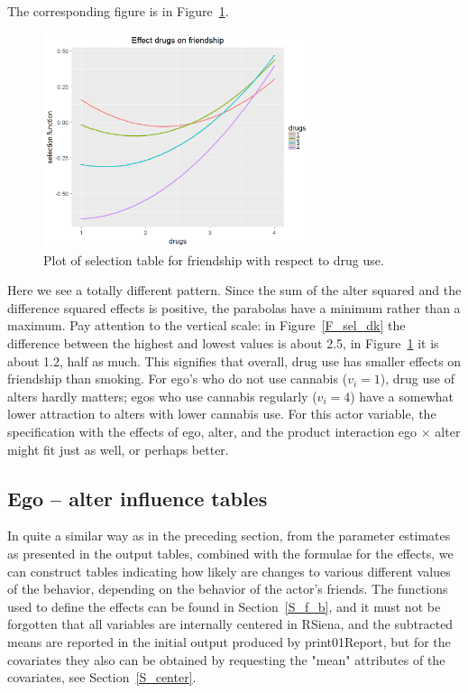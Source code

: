 \documentclass[a4paper,fleqn,11pt]{article}
\newcommand{\+}{\, + \,}
\newcommand{\sfn}[1]{\textsf{#1}}
\newcommand{\rs}{{\sf RSiena}}
\begin{document}
The corresponding figure is in Figure~\ref{F_sel_dg}.

\begin{figure}[htb]
  \centering
  \includegraphics[width=0.7\textwidth]{selectionTable_drugs.png}
  \caption{Plot of selection table  for friendship with respect to drug use.}
  \label{F_sel_dg}
\end{figure}

Here we see a totally different pattern.
Since the sum of the alter squared and the difference squared effects
is positive, the parabolas have a minimum rather than a maximum.
Pay attention to the vertical scale: in Figure~\ref{F_sel_dk} the
difference between the highest and lowest values is about 2.5,
in Figure~\ref{F_sel_dg} it is about 1.2, half as much.
This signifies that overall, drug use has smaller effects on friendship
than smoking. For ego's who do not use cannabis ($v_i = 1$),
drug use of alters hardly matters;
egos who use cannabis regularly ($v_i = 4$) have a somewhat lower
attraction to alters with lower cannabis use.
For this actor variable, the specification with the effects of ego, alter,
and the product interaction ego $\times$ alter might fit just as well,
or perhaps better.

\clearpage

\subsection{Ego -- alter influence tables}

In quite a similar way as in the preceding section,
from the parameter estimates as presented in the
output tables, combined with the formulae for the effects,
we can construct tables indicating how likely are changes to
various different values of the behavior,
depending on the behavior of the actor's friends.
The functions used to define the effects can be found
in Section~\ref{S_f_b}, and it must not be forgotten that all variables
are internally centered in \rs, and the subtracted means are reported
in the initial output produced by \sfn{print01Report},
but for the covariates they also can be obtained by requesting the
\textsf{"mean"} attributes of the covariates, see Section~\ref{S_center}.
\end{document}
